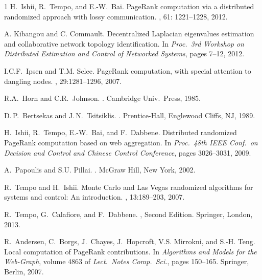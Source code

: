 \documentclass[11pt,draftcls,onecolumn]{IEEEtran}
\begin{document}
\begin{thebibliography}{1}
H.~Ishii, R.~Tempo, and E.-W.~Bai.
\newblock 
PageRank computation via a distributed randomized approach with lossy communication.
, 61: 1221--1228, 2012. 

A. Kibangou and C. Commault.
\newblock Decentralized Laplacian eigenvalues estimation and collaborative 
network topology identification.
\newblock In {\em Proc.\ {\rm 3}rd Workshop on Distributed Estimation and 
Control of Networked Systems}, pages 7--12, 2012.

I.{\;}C.{\;}F.~Ipsen and T.{\;}M. Selee.
\newblock PageRank computation, with special attention to dangling nodes.
, 29:1281--1296, 2007.


R.{\;}A.\ Horn and C.{\;}R.\ Johnson.
.
\newblock Cambridge Univ.\ Press, 1985.

D.{\,}P.\ Bertsekas and J.{\,}N.\ Tsitsiklis.
.
\newblock Prentice-Hall, Englewood Cliffs, NJ, 1989.


H.~Ishii, R.~Tempo, E.-W.\ Bai, and F.~Dabbene.
\newblock Distributed randomized {P}age{R}ank computation based on web
  aggregation.
\newblock In {\em Proc.\ {\rm 48}th IEEE Conf.\ on Decision and Control and
  Chinese Control Conference}, pages 3026--3031, 2009.

A.~Papoulis and S.{\;}U. Pillai.
.
\newblock McGraw Hill, New York, 2002.

R.~Tempo and H.~Ishii.
\newblock Monte {C}arlo and {L}as {V}egas randomized algorithms for systems and
  control: {A}n introduction.
, 13:189--203, 2007.

R.~Tempo, G.~Calafiore, and F.~Dabbene.
, 
Second Edition.
\newblock Springer, London, 2013.

R.~Andersen, C.~Borgs, J.~Chayes, J.~Hopcroft, V.{\;}S. Mirrokni, and S.-H.
  Teng.
\newblock Local computation of {P}age{R}ank contributions.
\newblock In {\em Algorithms and Models for the Web-Graph}, volume 4863 of {\em
  Lect.\ Notes Comp.\ Sci.}, pages 150--165. Springer, Berlin, 2007.


\end{thebibliography}
\end{document}
